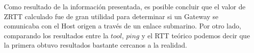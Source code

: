 Como resultado de la información presentada, es posible concluir que el valor de ZRTT calculado fue de gran utilidad para determinar si un Gateway se comunicaba con el Host origen a través de un enlace submarino. Por otro lado, comparando los resultados entre la $tool$, $ping$ y el RTT teórico podemos decir que la primera obtuvo resultados bastante cercanos a la realidad.